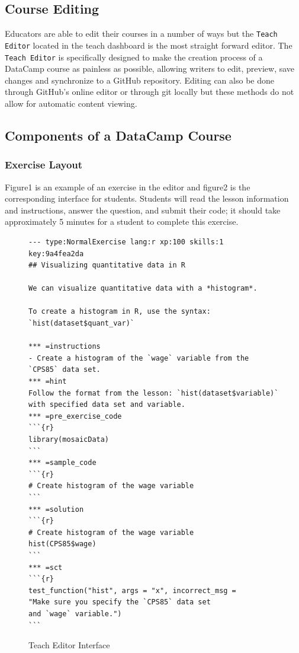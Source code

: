 \documentclass[12pt]{article}\usepackage[]{graphicx}\usepackage[]{color}
\begin{document}
\subsection{Course Editing}
Educators are able to edit their courses in a number of ways but the \texttt{Teach Editor} located in the teach dashboard is the
most straight forward editor. The \texttt{Teach Editor} is specifically designed to make the creation process of a DataCamp course
as painless as possible, allowing writers to edit, preview, save changes and synchronize to a GitHub repository. Editing can
also be done through GitHub's online editor or through git locally but these methods do not allow for automatic content
viewing.
\subsection{Components of a DataCamp Course}
\subsubsection{Exercise Layout}
Figure1 is an example of an exercise in the editor and figure2 is the corresponding interface for students. Students will read the lesson information and instructions, answer the question, and submit their code; it should take approximately 5 minutes for a student to complete this exercise.
\begin{figure}
\caption{Teach Editor Interface}
\begin{Verbatim}[frame=single]
--- type:NormalExercise lang:r xp:100 skills:1 key:9a4fea2da
## Visualizing quantitative data in R

We can visualize quantitative data with a *histogram*.

To create a histogram in R, use the syntax:
`hist(dataset$quant_var)`

*** =instructions
- Create a histogram of the `wage` variable from the 
`CPS85` data set.
*** =hint
Follow the format from the lesson: `hist(dataset$variable)`
with specified data set and variable.
*** =pre_exercise_code
```{r}
library(mosaicData)
```
*** =sample_code
```{r}
# Create histogram of the wage variable
```
*** =solution
```{r}
# Create histogram of the wage variable 
hist(CPS85$wage)
```
*** =sct
```{r}
test_function("hist", args = "x", incorrect_msg = 
"Make sure you specify the `CPS85` data set
and `wage` variable.")
```
\end{Verbatim}
\label{fig:code1}
\end{figure}
\end{document}
